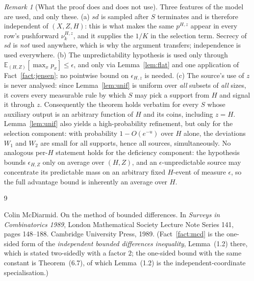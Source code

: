 \documentclass[11pt,a4paper]{article}
\theoremstyle{plain}
\theoremstyle{definition}
\theoremstyle{remark}
\newtheorem{remark}{Remark}
\newcommand{\sd}{\mathit{sd}}
\begin{document}
\begin{remark}[What the proof does and does not use]
Three features of the model are used, and only these. (a) $\sd$ is sampled after $S$ terminates and
is therefore independent of $(X,Z,H)$: this is what makes the same $p^{H,z}$ appear in every row's
pushforward $\nu^{H,z}_{k}$, and it supplies the $1/K$ in the selection term. Secrecy of $\sd$ is
\emph{not} used anywhere, which is why the argument transfers; independence is used everywhere. (b)
The unpredictability hypothesis is used only through $\mathbb{E}_{(H,Z)}[\max_x p_x] \le \epsilon$,
and only via Lemma~\ref{lem:flat} and one application of Fact~\ref{fact:jensen}; no pointwise bound on
$\epsilon_{H,z}$ is needed. (c) The source's use of $z$ is never analysed: since
Lemma~\ref{lem:unif} is uniform over \emph{all} subsets of \emph{all} sizes, it covers every
measurable rule by which $S$ may pick a support from $H$ and signal it through $z$. Consequently the
theorem holds verbatim for every $S$ whose auxiliary output is an arbitrary function of $H$ and its
coins, including $z = H$. Lemma~\ref{lem:unif} also yields a high-probability refinement, but only
for the selection component: with probability $1 - O(e^{-u})$ over $H$ alone, the deviations
$W_{1}$ and $W_{2}$ are small for all supports, hence all sources, simultaneously. No analogous per-$H$ statement holds for
the deficiency component: the hypothesis bounds $\epsilon_{H,Z}$ only on average over $(H,Z)$, and
an $\epsilon$-unpredictable source may concentrate its predictable mass on an arbitrary fixed $H$-event of
measure $\epsilon$, so the full advantage bound is inherently an average over $H$.
\end{remark}

\begin{thebibliography}{9}

Colin McDiarmid.
\newblock On the method of bounded differences.
\newblock In \emph{Surveys in Combinatorics 1989}, London Mathematical Society Lecture Note
Series 141, pages 148--188. Cambridge University Press, 1989.
\newblock (Fact~\ref{fact:mcd} is the one-sided form of the \emph{independent bounded differences
inequality}, Lemma~(1.2) there, which is stated two-sidedly with a factor $2$; the one-sided bound
with the same constant is Theorem~(6.7), of which Lemma~(1.2) is the independent-coordinate
specialisation.)

\end{thebibliography}
\end{document}
